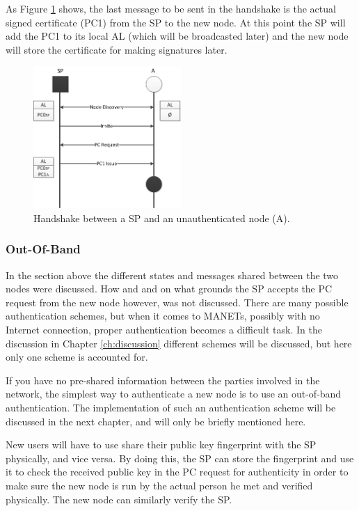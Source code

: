As Figure \ref{fig:node_states_handshake} shows, the last message to be sent in
the handshake is the actual signed certificate (\ac{PC1}) from the \ac{SP} to
the new node. At this point the \ac{SP} will add the \ac{PC1} to its local
\ac{AL} (which will be broadcasted later) and the new node will store the
certificate for making signatures later.

\begin{figure}[h]
	\centering
  	\includegraphics[width=0.5\textwidth]{images/node_states_handshake.png}
  	\caption{Handshake between a \acf{SP} and an unauthenticated node (A).}
	\label{fig:node_states_handshake}
\end{figure}

\subsubsection*{Out-Of-Band}
In the section above the different states and messages shared between the two
nodes were discussed. How and and on what grounds the \ac{SP} accepts the
\ac{PC} request from the new node however, was not discussed. There are many
possible authentication schemes, but when it comes to \acp{MANET}, possibly with
no Internet connection, proper authentication becomes a difficult task. In
the discussion in Chapter \ref{ch:discussion} different schemes will be
discussed, but here only one scheme is accounted for.

If you have no pre-shared information between the parties involved in the
network, the simplest way to authenticate a new node is to use an out-of-band
authentication. The implementation of such an authentication scheme will be
discussed in the next chapter, and will only be briefly mentioned here.

New users will have to use share their public key fingerprint with the \ac{SP}
physically, and vice versa. By doing this, the \ac{SP} can store the fingerprint
and use it to check the received public key in the \ac{PC} request for
authenticity in order to make sure the new node is run by the actual person he
met and verified physically. The new node can similarly verify the \ac{SP}.

